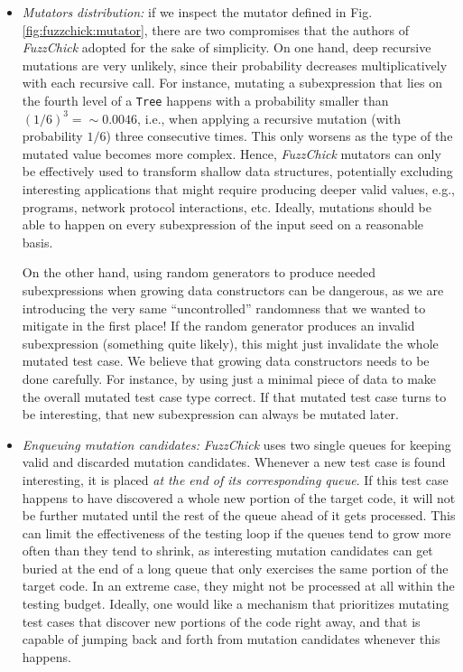 \documentclass[sigconf, anonymous]{acmart}
\newcommand{\fuzzchick}{\textit{FuzzChick}\xspace}
\begin{document}
\begin{itemize}
\item \emph{Mutators distribution:}
%
if we inspect the mutator defined in Fig. \ref{fig:fuzzchick:mutator}, there are
two compromises that the authors of \fuzzchick adopted for the sake of
simplicity.
%
On one hand, deep recursive mutations are very unlikely, since their probability
decreases multiplicatively with each recursive call.
%
For instance, mutating a subexpression that lies on the fourth level of a
\texttt{Tree} happens with a probability smaller than $(1/6)^3 = \sim 0.0046$,
i.e., when applying a recursive mutation (with probability $1/6$) three
consecutive times.
%
This only worsens as the type of the mutated value becomes more complex.
%
Hence, \fuzzchick mutators can only be effectively used to transform shallow
data structures, potentially excluding interesting applications that might
require producing deeper valid values, e.g., programs, network protocol
interactions, etc.
%
Ideally, mutations should be able to happen on every subexpression of the input
seed on a reasonable basis.

On the other hand, using random generators to produce needed subexpressions
when growing data constructors can be dangerous, as we are introducing the very
same ``uncontrolled'' randomness that we wanted to mitigate in the first place!
%
If the random generator produces an invalid subexpression (something quite
likely), this might just invalidate the whole mutated test case.
%
We believe that growing data constructors needs to be done carefully.
%
For instance, by using just a minimal piece of data to make the overall mutated
test case type correct.
%
If that mutated test case turns to be interesting, that new subexpression can
always be mutated later.

\item \emph{Enqueuing mutation candidates:}
%
\fuzzchick uses two single queues for keeping valid and discarded mutation
candidates.
%
Whenever a new test case is found interesting, it is placed \emph{at the end of
  its corresponding queue}.
%
If this test case happens to have discovered a whole new portion of the target
code, it will not be further mutated until the rest of the queue ahead of it
gets processed.
%
This can limit the effectiveness of the testing loop if the queues tend to grow
more often than they tend to shrink, as interesting mutation candidates can get
buried at the end of a long queue that only exercises the same portion of the
target code.
%
In an extreme case, they might not be processed at all within the testing
budget.
%
Ideally, one would like a mechanism that prioritizes mutating test cases that
discover new portions of the code right away, and that is capable of jumping
back and forth from mutation candidates whenever this happens.
%



\end{itemize}
\end{document}
